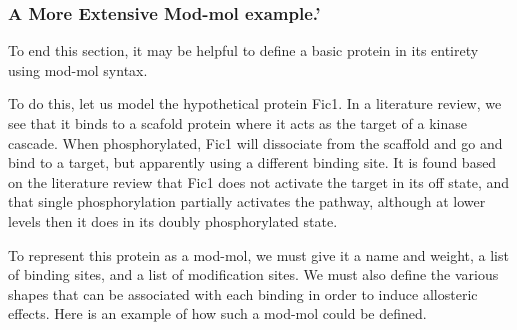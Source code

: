 \subsubsection{A More Extensive Mod-mol example.'}

To end this section, it may be helpful to define a basic protein in
its entirety using mod-mol syntax.

To do this, let us model the hypothetical protein Fic1.  In a
literature review, we see that it binds to a scafold protein where it
acts as the target of a kinase cascade.  When phosphorylated, Fic1
will dissociate from the scaffold and go and bind to a target, but
apparently using a different binding site.  It is found based on the
literature review that Fic1 does not activate the target in its off
state, and that single phosphorylation partially activates the
pathway, although at lower levels then it does in its doubly
phosphorylated state.

To represent this protein as a mod-mol, we must give it a name and
weight, a list of binding sites, and a list of modification sites.  We
must also define the various shapes that can be associated with each
binding in order to induce allosteric effects.  Here is an example of
how such a mod-mol could be defined.

